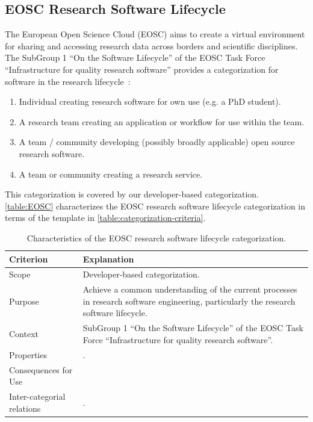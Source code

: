 \documentclass{IEEEcsmag}
\begin{document}
\subsection{EOSC Research Software Lifecycle}

The European Open Science Cloud (EOSC) aims to create a virtual environment for sharing and accessing research data across borders and scientific disciplines. 
The SubGroup 1 ``On the Software Lifecycle'' of the EOSC Task Force ``Infrastructure for quality research software'' provides a categorization for software in the research lifecycle~\cite{Courbebaisse_2023}:
\begin{enumerate}
	\item Individual creating research software for own use (e.g. a PhD student).
	\item A research team creating an application or workflow for use within the team.
	\item A team / community developing (possibly broadly applicable) open source research software.
	\item A team or community creating a research service.
\end{enumerate}
This categorization is covered by our developer-based categorization.
\autoref{table:EOSC} characterizes the EOSC research software lifecycle categorization in terms of the template in \autoref{table:categorization-criteria}.

\begin{table}[bt]
    \centering
    \begin{tabularx}{\textwidth}{l X}
    \toprule
        Criterion & Explanation \\
    \midrule
        Scope & Developer-based categorization. \\
        Purpose & Achieve a common understanding of the current processes in research software engineering, particularly the research software lifecycle.\\
        Context & SubGroup 1 ``On the Software Lifecycle'' of the EOSC Task Force ``Infrastructure for quality research software''. \\
        Properties & .\\
        Consequences for Use & \\
        Inter-categorial relations & .\\
    \bottomrule
    \end{tabularx}
    \caption{Characteristics of the EOSC research software lifecycle categorization.}
    \label{table:EOSC}
\end{table}
\end{document}
